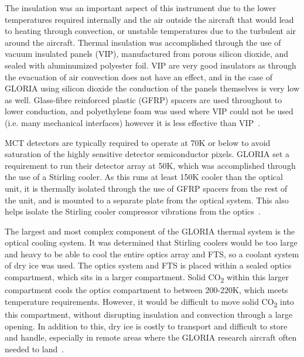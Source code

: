 The insulation was an important aspect of this instrument due to the lower temperatures required internally and the air outside the aircraft that would lead to heating through convection, or unstable temperatures due to the turbulent air around the aircraft. Thermal insulation was accomplished through the use of vacuum insulated panels (VIP), manufactured from porous silicon dioxide, and sealed with aluminumized polyester foil. VIP are very good insulators as through the evacuation of air convection does not have an effect, and in the case of GLORIA using silicon dioxide the conduction of the panels themselves is very low as well. Glass-fibre reinforced plastic (GFRP) spacers are used throughout to lower conduction, and polyethylene foam was used where VIP could not be used (i.e. many mechanical interfaces) however it is less effective than VIP~\citep{GLORIA_thermalmech}.

MCT detectors are typically required to operate at 70K or below to avoid saturation of the highly sensitive detector semiconductor pixels. GLORIA set a requirement to run their detector array at 50K, which was accomplished through the use of a Stirling cooler. As this runs at least 150K cooler than the optical unit, it is thermally isolated through the use of GFRP spacers from the rest of the unit, and is mounted to a separate plate from the optical system. This also helps isolate the Stirling cooler compressor vibrations from the optics~\citep{GLORIA_thermalmech}.

The largest and most complex component of the GLORIA thermal system is the optical cooling system. It was determined that Stirling coolers would be too large and heavy to be able to cool the entire optics array and FTS, so a coolant system of dry ice was used. The optics system and FTS is placed within a sealed optics compartment, which sits in a larger compartment. Solid CO\textsubscript{2} within this larger compartment cools the optics compartment to between 200-220K, which meets temperature requirements. However, it would be difficult to move solid CO\textsubscript{2} into this compartment, without disrupting insulation and convection through a large opening. In addition to this, dry ice is costly to transport and difficult to store and handle, especially in remote areas where the GLORIA research aircraft often needed to land~\citep{GLORIA_thermalmech}.

